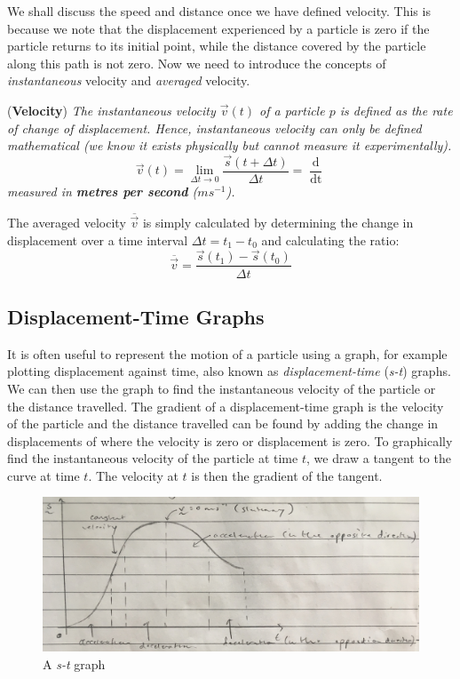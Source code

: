 We shall discuss the speed and distance once we have defined velocity. This is because we note that the displacement experienced by a particle is zero if the particle returns to its initial point, while the distance covered by the particle along this path is not zero. Now we need to introduce the concepts of \textit{instantaneous} velocity and \textit{averaged} velocity.

\begin{definition}{(\textbf{Velocity})}
\textit{The instantaneous velocity $\vec{v}(t)$ of a particle $p$ is defined as the rate of change of displacement. Hence, instantaneous velocity can only be defined mathematical (we know it exists physically but cannot measure it experimentally).}
\begin{equation}
    \vec{v}(t) = \lim_{\Delta t \rightarrow 0} \frac{\vec{s}(t + \Delta t)}{\Delta t} = \frac{\mathop{\mathrm{d}\vec{s}(t)}}{\mathop{\mathrm{d}t}}
\end{equation}
\textit{measured in \textbf{metres per second} ($ms^{-1}$).}
\end{definition}

The averaged velocity $\overline{\vec{v}}$ is simply calculated by determining the change in displacement over a time interval $\Delta t = t_1 - t_0$ and calculating the ratio:
\begin{equation}
    \overline{\vec{v}} = \frac{\vec{s}(t_1) - \vec{s}(t_0)}{\Delta t}
\end{equation}

\subsection{Displacement-Time Graphs}

It is often useful to represent the motion of a particle using a graph, for example plotting displacement against time, also known as \textit{displacement-time} (\textit{s-t}) graphs. We can then use the graph to find the instantaneous velocity of the particle or the distance travelled. The gradient of a displacement-time graph is the velocity of the particle and the distance travelled can be found by adding the change in displacements of where the velocity is zero or displacement is zero. To graphically find the instantaneous velocity of the particle at time $t$, we draw a tangent to the curve at time $t$. The velocity at $t$ is then the gradient of the tangent. 


\begin{figure}[h!]
    \centering
    \includegraphics[scale=0.1]{notes/images/Displacement-Time-Graph.JPG}
    \caption{A \textit{s-t} graph}
\end{figure}
\FloatBarrier

